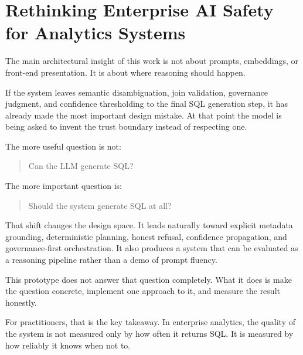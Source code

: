 \documentclass[11pt]{article}
\begin{document}
\section{Rethinking Enterprise AI Safety for Analytics Systems}

The main architectural insight of this work is not about prompts, embeddings, or front-end presentation. It is about where reasoning should happen.

If the system leaves semantic disambiguation, join validation, governance judgment, and confidence thresholding to the final SQL generation step, it has already made the most important design mistake. At that point the model is being asked to invent the trust boundary instead of respecting one.

The more useful question is not:

\begin{quote}
Can the LLM generate SQL?
\end{quote}

The more important question is:

\begin{quote}
Should the system generate SQL at all?
\end{quote}

That shift changes the design space. It leads naturally toward explicit metadata grounding, deterministic planning, honest refusal, confidence propagation, and governance-first orchestration. It also produces a system that can be evaluated as a reasoning pipeline rather than a demo of prompt fluency.

This prototype does not answer that question completely. What it does is make the question concrete, implement one approach to it, and measure the result honestly.

For practitioners, that is the key takeaway. In enterprise analytics, the quality of the system is not measured only by how often it returns SQL. It is measured by how reliably it knows when not to.
\end{document}
